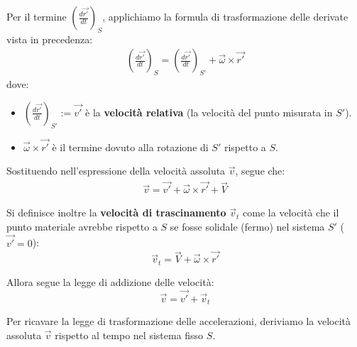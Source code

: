 \documentclass[11pt, a4paper, openright]{book}
\theoremstyle{plain}
\theoremstyle{definition}
\begin{document}
Per il termine $\left(\frac{d\vec{r'}}{dt}\right)_S$, applichiamo la formula di trasformazione delle derivate vista in precedenza:
\begin{align}
    \left(\frac{d\vec{r'}}{dt}\right)_S = \left(\frac{d\vec{r'}}{dt}\right)_{S'} + \vec{\omega} \times \vec{r'}
\end{align}
dove:
\begin{itemize}
    \item $\displaystyle \left(\frac{d\vec{r'}}{dt}\right)_{S'} := \vec{v'}$ è la \textbf{velocità relativa} (la velocità del punto misurata in $S'$).
    \item $\vec{\omega} \times \vec{r'}$ è il termine dovuto alla rotazione di $S'$ rispetto a $S$.
\end{itemize}

Sostituendo nell'espressione della velocità assoluta $\vec{v}$, segue che:
\begin{align}
    \vec{v} = \vec{v'} + \vec{\omega} \times \vec{r'} + \vec{V}
\end{align}

Si definisce inoltre la \textbf{velocità di trascinamento} $\vec{v}_t$ come la velocità che il punto materiale avrebbe rispetto a $S$ se fosse solidale (fermo) nel sistema $S'$ ($\vec{v'} = 0$):
\[\vec{v}_t = \vec{V} + \vec{\omega} \times \vec{r'}\]

Allora segue la legge di addizione delle velocità:
\[\vec{v} = \vec{v'} + \vec{v}_t\]


Per ricavare la legge di trasformazione delle accelerazioni, deriviamo la velocità assoluta $\vec{v}$ rispetto al tempo nel sistema fisso $S$. 
\end{document}
